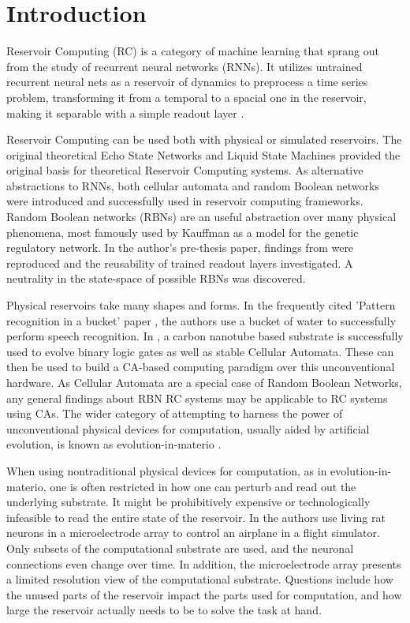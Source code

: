 \chapter{Introduction}

Reservoir Computing (RC) is a category of machine learning that sprang out from the study of recurrent neural networks (RNNs).
It utilizes untrained recurrent neural nets as a reservoir of dynamics to preprocess a time series problem,
transforming it from a temporal to a spacial one in the reservoir,
making it separable with a simple readout layer \cite{lukovsevivcius2012reservoir}.

Reservoir Computing can be used both with physical or simulated reservoirs.
The original theoretical Echo State Networks \cite{jaeger2002adaptive} and Liquid State Machines \cite{natschlager2002liquid} provided the original basis for theoretical Reservoir Computing systems.
As alternative abstractions to RNNs,
both cellular automata \cite{yilmaz2014reservoir} and random Boolean networks \cite{rbn-reservoir} were introduced and successfully used in reservoir computing frameworks.
Random Boolean networks (RBNs) \cite{gershenson2004introduction} are an useful abstraction over many physical phenomena,
most famously used by Kauffman \cite{kauffman1969metabolic} as a model for the genetic regulatory network.
In the author's pre-thesis paper,
findings from \cite{rbn-reservoir} were reproduced and the reusability of trained readout layers investigated.
A neutrality in the state-space of possible RBNs was discovered.

Physical reservoirs take many shapes and forms.
In the frequently cited 'Pattern recognition in a bucket' paper \cite{fernando2003pattern},
the authors use a bucket of water to successfully perform speech recognition.
In \cite{farstad2015evolving},
a carbon nanotube based substrate is successfully used to evolve binary logic gates as well as stable Cellular Automata.
These can then be used to build a CA-based computing paradigm over this unconventional hardware.
As Cellular Automata are a special case of Random Boolean Networks,
any general findings about RBN RC systems may be applicable to RC systems using CAs.
The wider category of attempting to harness the power of unconventional physical devices for computation,
usually aided by artificial evolution,
is known as evolution-in-materio \cite{miller2002evolution}.

When using nontraditional physical devices for computation, as in evolution-in-materio,
one is often restricted in how one can perturb and read out the underlying substrate.
It might be prohibitively expensive or technologically infeasible to read the entire state of the reservoir.
In \cite{demarse2005adaptive} the authors use living rat neurons in a microelectrode array to control an airplane in a flight simulator.
Only subsets of the computational substrate are used,
and the neuronal connections even change over time.
In addition, the microelectrode array presents a limited resolution view of the computational substrate.
Questions include how the unused parts of the reservoir impact the parts used for computation,
and how large the reservoir actually needs to be to solve the task at hand.


